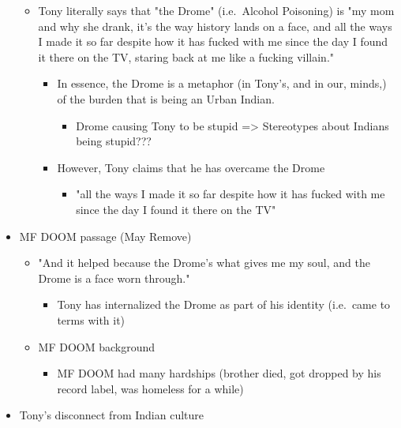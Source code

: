 \documentclass[letterpaper]{article}
\begin{document}
\begin{itemize}
\begin{itemize}
\item Tony literally says that "the Drome" (i.e. Alcohol Poisoning) is "my
mom and why she drank, it's the way history lands on a face, and all
the ways I made it so far despite how it has fucked with me since
the day I found it there on the TV, staring back at me like a
fucking villain."

\begin{itemize}
\item In essence, the Drome is a metaphor (in Tony's, and in our,
minds,) of the burden that is being an Urban Indian.

\begin{itemize}
\item Drome causing Tony to be stupid => Stereotypes about Indians
being stupid???
\end{itemize}

\item However, Tony claims that he has overcame the Drome

\begin{itemize}
\item "all the ways I made it so far despite how it has fucked with me
since the day I found it there on the TV"
\end{itemize}
\end{itemize}
\end{itemize}

\item MF DOOM passage (May Remove)

\begin{itemize}
\item "And it helped because the Drome's what gives me my soul, and the
Drome is a face worn through."

\begin{itemize}
\item Tony has internalized the Drome as part of his identity (i.e. came
to terms with it)
\end{itemize}

\item MF DOOM background

\begin{itemize}
\item MF DOOM had many hardships (brother died, got dropped by his
record label, was homeless for a while)
\end{itemize}
\end{itemize}

\item Tony's disconnect from Indian culture


\end{itemize}
\end{document}
